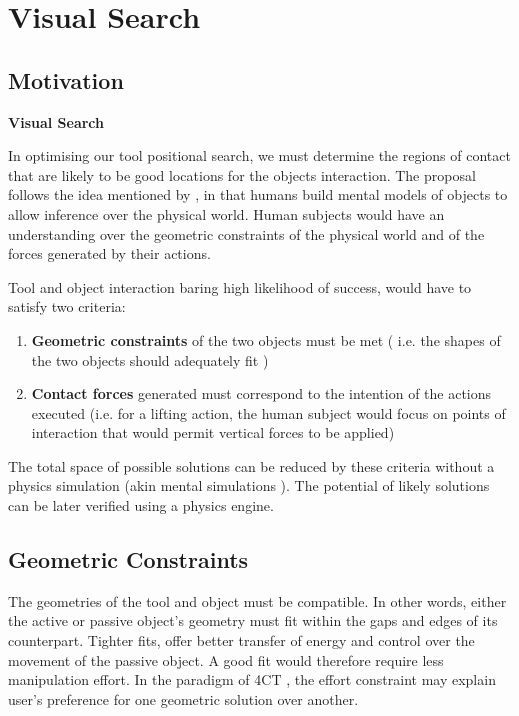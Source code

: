 \documentclass{article}
\let \shorttitle \textbf
\begin{document}
\section{Visual Search}

\subsection{Motivation}
\shorttitle{Visual Search}

In optimising our tool positional search, we must determine the regions of contact that are likely to be good locations for the objects interaction.
The proposal follows the idea mentioned by \cite{battaglia2013}, in that humans build mental models of objects to allow inference over the physical world.
Human subjects would have an understanding over the geometric constraints of the physical world and of the forces generated by their actions.

Tool and object interaction baring high likelihood of success, would have to satisfy two criteria: 
\begin{enumerate}
\item \textbf{Geometric constraints} of the two objects must be met ( i.e. the shapes of the two objects should adequately fit )
\item \textbf{Contact forces} generated must correspond to the intention of the actions executed 
  (i.e. for a lifting action, the human subject would focus on points of interaction that would permit vertical forces to be applied)
\end{enumerate}

The total space of possible solutions can be reduced by these criteria without a physics simulation (akin mental simulations \cite{osiurak2014}).
The potential of likely solutions can be later verified using a physics engine. 

\subsection{Geometric Constraints}
The geometries of the tool and object must be compatible. In other words, either the active or passive object's geometry must fit within the gaps and edges of its counterpart.
Tighter fits, offer better transfer of energy and control over the movement of the passive object. A good fit would therefore require less manipulation effort.
In the paradigm of 4CT \cite{osiurak2014}, the effort constraint may explain user's preference for one geometric solution over another.
\end{document}
